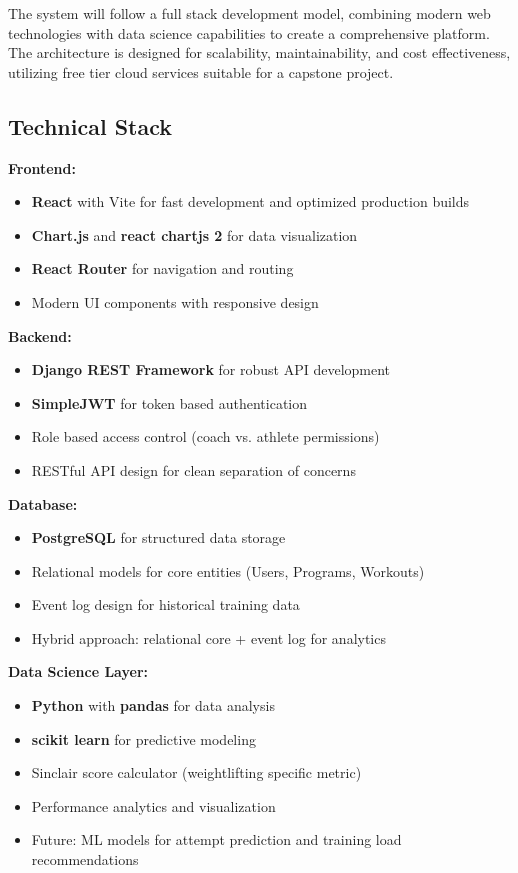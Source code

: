 \documentclass[11pt, oneside]{article}   	%
\begin{document}
The system will follow a full stack development model, combining modern web technologies with data science capabilities to create a comprehensive platform. The architecture is designed for scalability, maintainability, and cost effectiveness, utilizing free tier cloud services suitable for a capstone project.

\subsection*{Technical Stack}

\textbf{Frontend:}
\begin{itemize}
    \item \textbf{React} with Vite for fast development and optimized production builds
    \item \textbf{Chart.js} and \textbf{react chartjs 2} for data visualization
    \item \textbf{React Router} for navigation and routing
    \item Modern UI components with responsive design
\end{itemize}

\textbf{Backend:}
\begin{itemize}
    \item \textbf{Django REST Framework} for robust API development
    \item \textbf{SimpleJWT} for token based authentication
    \item Role based access control (coach vs. athlete permissions)
    \item RESTful API design for clean separation of concerns
\end{itemize}

\textbf{Database:}
\begin{itemize}
    \item \textbf{PostgreSQL} for structured data storage
    \item Relational models for core entities (Users, Programs, Workouts)
    \item Event log design for historical training data
    \item Hybrid approach: relational core + event log for analytics
\end{itemize}

\textbf{Data Science Layer:}
\begin{itemize}
    \item \textbf{Python} with \textbf{pandas} for data analysis
    \item \textbf{scikit learn} for predictive modeling
    \item Sinclair score calculator (weightlifting specific metric)
    \item Performance analytics and visualization
    \item Future: ML models for attempt prediction and training load recommendations
\end{itemize}
\end{document}
